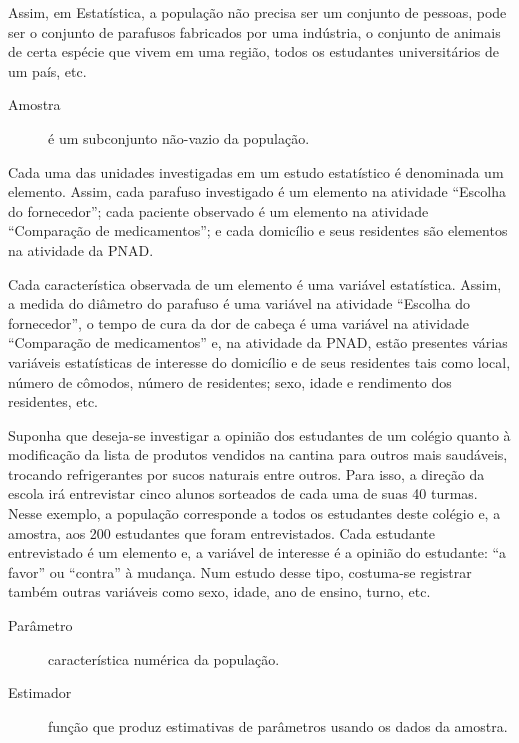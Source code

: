 Assim, em Estatística, a população não precisa ser um conjunto de pessoas, pode ser o conjunto de parafusos fabricados por uma indústria, o conjunto de animais de certa espécie que vivem em uma região, todos os estudantes universitários de um país, etc.
\begin{description}
\item[{Amostra}] \leavevmode{}\label{est1-def-4}
é um subconjunto não-vazio da população.

\end{description}

Cada uma das unidades investigadas em um estudo estatístico é denominada um elemento.  Assim, cada parafuso investigado é um elemento na atividade ``Escolha do fornecedor''; cada paciente observado é um elemento na atividade ``Comparação de medicamentos''; e cada domicílio e seus residentes são elementos na atividade da PNAD.

Cada característica observada de um elemento é uma variável estatística. Assim, a medida do diâmetro do parafuso é uma variável na atividade ``Escolha do fornecedor'', o tempo de cura da dor de cabeça é uma variável na atividade ``Comparação de medicamentos'' e, na atividade da PNAD, estão presentes várias variáveis estatísticas de interesse do domicílio e de seus residentes tais como local, número de cômodos, número de residentes; sexo, idade e rendimento dos residentes, etc.

Suponha que deseja-se investigar a opinião dos estudantes de um colégio quanto à modificação da lista de produtos vendidos na cantina para outros mais saudáveis, trocando refrigerantes por sucos naturais entre outros. Para isso, a direção da escola irá entrevistar cinco alunos sorteados de cada uma de suas 40 turmas. Nesse exemplo, a população corresponde a todos os estudantes deste colégio e, a amostra, aos 200 estudantes que foram entrevistados. Cada estudante entrevistado é um elemento e, a variável de interesse  é a opinião do estudante: ``a favor'' ou ``contra'' à mudança. Num estudo desse tipo, costuma-se registrar também outras variáveis como sexo, idade, ano de ensino, turno, etc.
\begin{description}
\item[{Parâmetro}] \leavevmode{}\label{est1-def-5}
característica numérica da população.

\end{description}
\begin{description}
\item[{Estimador}] \leavevmode{}\label{est1-def-6}
função que produz estimativas de parâmetros usando os dados da amostra.

\end{description}

